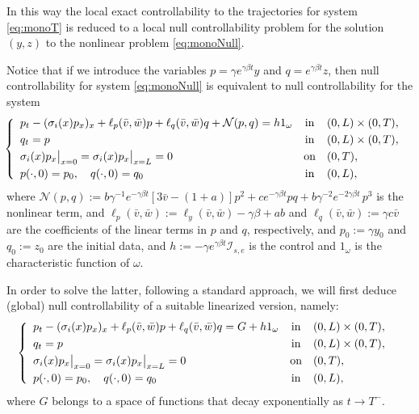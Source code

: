 \documentclass[10pt]{article}
\def\dis{\displaystyle}
\def\om{\omega}
\def\\Phivec{\mathbf{\Phi}}
\begin{document}
    In this way the local exact controllability to the trajectories for system \eqref{eq:monoT} is reduced to a local null
    controllability problem for the solution $(y,z)$ to the nonlinear problem \eqref{eq:monoNull}.

    Notice that if we introduce the variables $p=\gamma e^{\gamma\beta t}y$ and $q= e^{\gamma\beta t}z$,
    then null controllability for system \eqref{eq:monoNull} is equivalent to null controllability for the  system
\begin{equation}\label{eq:monoNull1}
    \!\!\!\!\!\left\{
        \begin{array}{lcl}
        p_t-(\sigma_i(x) p_x)_x +\ell_p(\bar v,\bar w)p+ \ell_q(\bar v,\bar w) q+\mathcal{N}(p,q)
         = h1_{\omega}         &  \mbox{in}&    (0,L) \times (0,T),    \\
            \noalign{\smallskip}\dis
            q_t  =   p                    &  \mbox{in}& (0,L) \times (0,T),        \\
            \noalign{\smallskip}\dis
            \sigma_i(x)p_x\big|_{x=0}=\sigma_i(x)p_x\big|_{x=L} = 0            & \mbox{on}& (0,T),    \\
            \noalign{\smallskip}\dis
            p(\cdot,0) =p_0,\quad q(\cdot,0) =q_0         & \mbox{in}&   (0,L),
        \end{array}
    \right.
\end{equation}
    where $\mathcal{N}(p,q):=b\gamma^{-1}e^{-\gamma\beta t}[3\bar v-(1+a)] p^2+ce^{-\gamma\beta t}pq
    + b\gamma^{-2}e^{-2\gamma\beta t}\,p^3$ is the nonlinear term, and
    $\ell_p(\bar v,\bar w):=\ell_y(\bar v,\bar w)-\gamma\beta+ab$ and $\ell_q(\bar v,\bar w):=\gamma c\bar v$
    are the coefficients of the linear terms in $p$ and $q$, respectively, and $p_0:=\gamma y_0$ and $q_0:=z_0$ are the initial data,
    and $ h:=-\gamma e^{\gamma\beta t}\mathcal{I}_{s,e}$ is the control and $1_\om$ is the characteristic function of $\om$.

    In order to solve the latter, following a standard approach, we will first deduce (global) null controllability of
    a suitable linearized version, namely:
\begin{equation}\label{eq:monoNulllinear}
    \!\!\!\!\!\left\{
        \begin{array}{lcl}
        p_t-(\sigma_i(x) p_x)_x +\ell_p(\bar v,\bar w)p+ \ell_q(\bar v,\bar w) q
         = G+h1_{\omega}         &  \mbox{in}&    (0,L) \times (0,T),      \\
            \noalign{\smallskip}\dis
            q_t  =   p                    &  \mbox{in}& (0,L) \times (0,T),        \\
            \noalign{\smallskip}\dis
            \sigma_i(x)p_x\big|_{x=0}=\sigma_i(x)p_x\big|_{x=L} = 0            & \mbox{on}& (0,T),    \\
            \noalign{\smallskip}\dis
            p(\cdot,0) =p_0,\quad q(\cdot,0) =q_0         & \mbox{in}&   (0,L),
        \end{array}
    \right.
\end{equation}
    where $G$ belongs to a space of functions that decay exponentially as $t\rightarrow T^-$.
\end{document}

